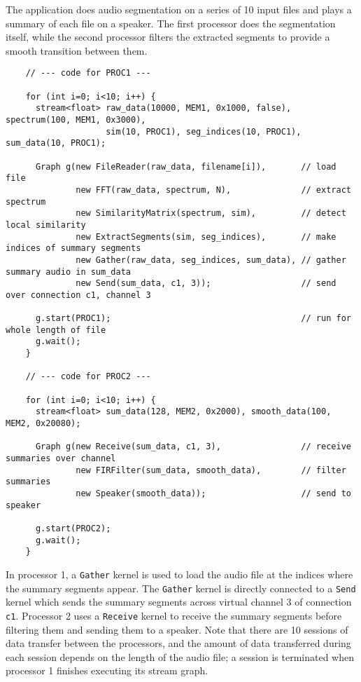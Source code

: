 The application does audio segmentation on a series of 10 input files
and plays a summary of each file on a speaker.  The first processor
does the segmentation itself, while the second processor filters the
extracted segments to provide a smooth transition between them.

{\small
\begin{verbatim}
    // --- code for PROC1 ---

    for (int i=0; i<10; i++) {
      stream<float> raw_data(10000, MEM1, 0x1000, false), spectrum(100, MEM1, 0x3000),
                    sim(10, PROC1), seg_indices(10, PROC1), sum_data(10, PROC1);

      Graph g(new FileReader(raw_data, filename[i]),       // load file
              new FFT(raw_data, spectrum, N),              // extract spectrum
              new SimilarityMatrix(spectrum, sim),         // detect local similarity
              new ExtractSegments(sim, seg_indices),       // make indices of summary segments
              new Gather(raw_data, seg_indices, sum_data), // gather summary audio in sum_data
              new Send(sum_data, c1, 3));                  // send over connection c1, channel 3

      g.start(PROC1);                                      // run for whole length of file
      g.wait();
    }

    // --- code for PROC2 ---

    for (int i=0; i<10; i++) {
      stream<float> sum_data(128, MEM2, 0x2000), smooth_data(100, MEM2, 0x20080);

      Graph g(new Receive(sum_data, c1, 3),                // receive summaries over channel
              new FIRFilter(sum_data, smooth_data),        // filter summaries
              new Speaker(smooth_data));                   // send to speaker

      g.start(PROC2);
      g.wait();
    }   
\end{verbatim}}
In processor 1, a {\tt Gather} kernel is used to load the audio file
at the indices where the summary segments appear.  The {\tt Gather}
kernel is directly connected to a {\tt Send} kernel which sends the
summary segments across virtual channel 3 of connection {\tt c1}.
Processor 2 uses a {\tt Receive} kernel to receive the summary
segments before filtering them and sending them to a speaker.  Note
that there are 10 sessions of data transfer between the processors,
and the amount of data transferred during each session depends on the
length of the audio file; a session is terminated when processor 1
finishes executing its stream graph.

